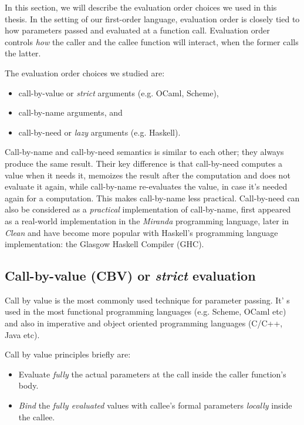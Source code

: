 \documentclass[diploma]{softlab-thesis}
\begin{document}
In this section, we will describe the evaluation order choices we used in this thesis. In the setting of our first-order language, evaluation order is closely tied to how parameters passed and evaluated at a function call. Evaluation order controls \textit{how} the caller and the callee function will interact, 
when the former calls the latter. 

The evaluation order choices we studied are: 
\begin{itemize}
  \item call-by-value or \textit{strict} arguments (e.g. OCaml, Scheme), 
  \item call-by-name arguments, and
  \item call-by-need or \textit{lazy} arguments (e.g. Haskell).
\end{itemize}

Call-by-name and call-by-need semantics is similar to each other; they always produce the same result.
Their key difference is that call-by-need computes a value when it needs it, memoizes the result after the computation 
and does not evaluate it again, while call-by-name re-evaluates the value, in case it's needed again for a computation.
This makes call-by-name less practical. Call-by-need can also be considered as a \textit{practical} implementation 
of call-by-name, first appeared as a real-world implementation in the \textit{Miranda} programming 
language, later in \textit{Clean} and have become more popular
with Haskell's programming language implementation: the Glasgow Haskell Compiler (GHC).

\subsection {Call-by-value (CBV) or \textit{strict} evaluation}
\label{sec:cbv}

Call by value is the most commonly used technique for parameter passing. It' s used in the most functional 
programming languages (e.g. Scheme, OCaml etc) and also in imperative and object oriented programming 
languages (C/C++, Java etc).

\par Call by value principles briefly are:
\begin{itemize}
  \item Evaluate \textit{fully} the actual parameters at the call inside the caller function's body.
  \item \textit{Bind} the \textit{fully evaluated} values with callee's formal parameters \textit{locally} inside the callee.
\end{itemize}
\end{document}
